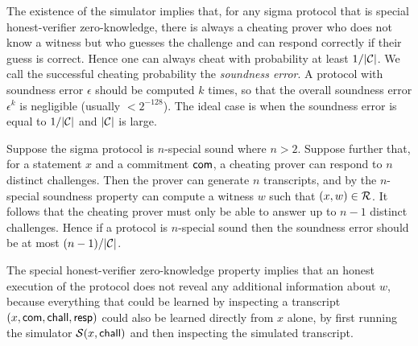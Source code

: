 \begin{remark}
The existence of the simulator implies that, for any sigma protocol that is special honest-verifier zero-knowledge, there is always a cheating prover who does not know a witness but who guesses the challenge and can respond correctly if their guess is correct.
Hence one can always cheat with probability at least $1/|\mathcal{C}|$.
We call the successful cheating probability the \emph{soundness error}.
A protocol with soundness error $\epsilon$ should be computed $k$ times, so that the overall soundness error $\epsilon^k$ is negligible (usually $< 2^{-128}$). 
The ideal case is when the soundness error is equal to $1/|\mathcal{C}|$ and $|\mathcal{C}|$ is large.

 Suppose the sigma protocol is $n$-special sound where $n > 2$. Suppose further that, for a statement $x$ and a commitment $\mathsf{com}$, a cheating prover can respond to $n$ distinct challenges. Then the prover can generate $n$ transcripts, and by the $n$-special soundness property can compute a witness $w$ such that $(x,w) \in \mathcal{R}$. It follows that the cheating prover must only be able to answer up to $n-1$ distinct challenges. Hence if a protocol is $n$-special sound then the soundness error should be at most $(n-1)/|\mathcal{C}|$.
\end{remark}

\begin{remark}
The special honest-verifier zero-knowledge property implies that an honest execution of the protocol does not reveal any additional information about $w$, because everything that could be learned by inspecting a transcript $(x,\mathsf{com},\mathsf{chall},\mathsf{resp})$ could also be learned directly from $x$ alone, by first running the simulator $\mathcal{S}(x,\mathsf{chall})$ and then inspecting the simulated transcript. 
\end{remark}

